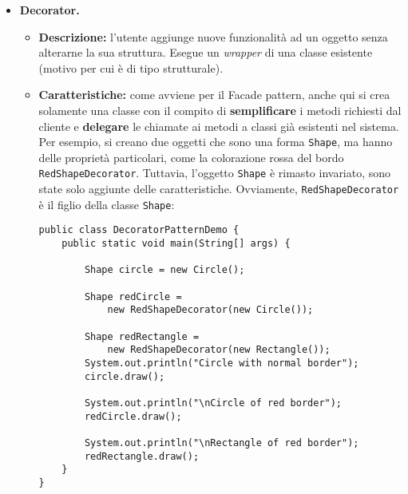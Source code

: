 \documentclass[a4paper,11pt]{article}
\begin{document}
\begin{itemize}
	\item[\ding{42}] \textbf{Decorator.}
		\begin{itemize}
			\item \textbf{Descrizione:} l'utente aggiunge nuove funzionalità ad un oggetto senza alterarne la sua struttura. Esegue un \emph{wrapper} di una classe esistente (motivo per cui è di tipo strutturale).
			\item \textbf{Caratteristiche:} come avviene per il Facade pattern, anche qui si crea solamente una classe con il compito di \textbf{semplificare} i metodi richiesti dal cliente e \textbf{delegare} le chiamate ai metodi a classi già esistenti nel sistema.\\
			Per esempio, si creano due oggetti che sono una forma \texttt{Shape}, ma hanno delle proprietà particolari, come la colorazione rossa del bordo \texttt{RedShapeDecorator}. Tuttavia, l'oggetto \texttt{Shape} è rimasto invariato, sono state solo aggiunte delle caratteristiche. Ovviamente, \texttt{RedShapeDecorator} è il figlio della classe \texttt{Shape}:
			\begin{lstlisting}
public class DecoratorPatternDemo {
	public static void main(String[] args) {
		
		Shape circle = new Circle();
		
		Shape redCircle = 
			new RedShapeDecorator(new Circle());
		
		Shape redRectangle = 
			new RedShapeDecorator(new Rectangle()); 
		System.out.println("Circle with normal border");
		circle.draw();
		
		System.out.println("\nCircle of red border"); 
		redCircle.draw();
		
		System.out.println("\nRectangle of red border"); 
		redRectangle.draw();
	} 
}
			\end{lstlisting}
		\end{itemize}
\end{itemize}

\newpage
\end{document}
